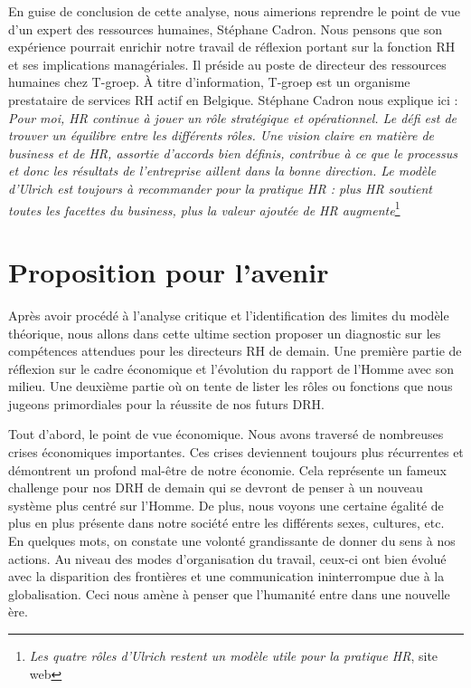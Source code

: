 \documentclass[a4paper, 12pt]{article}
\begin{document}
En guise de conclusion de cette analyse, nous aimerions reprendre le point de vue d'un expert des ressources humaines, Stéphane Cadron. Nous pensons que son expérience pourrait enrichir notre travail de réflexion portant sur la fonction RH et ses implications managériales. Il préside au poste de directeur des ressources humaines chez T-groep. À titre d'information, T-groep est un organisme prestataire de services RH actif en Belgique. Stéphane Cadron nous explique ici :
\textit{Pour moi, HR continue à jouer un rôle stratégique et opérationnel. Le défi est de trouver un équilibre entre les différents rôles. Une vision claire en matière de business et de HR, assortie d'accords bien définis, contribue à ce que le processus et donc les résultats de l'entreprise aillent dans la bonne direction. Le modèle d'Ulrich est toujours à recommander pour la pratique HR : plus HR soutient toutes les facettes du business, plus la valeur ajoutée de HR augmente}\footnote{\textit{Les quatre rôles d'Ulrich restent un modèle utile pour la pratique HR}, site web}

\section{Proposition pour l'avenir}

Après avoir procédé à l'analyse critique et l'identification des limites du modèle théorique, nous allons dans cette ultime section proposer un diagnostic sur les compétences attendues pour les directeurs RH de demain. Une première partie de réflexion sur le cadre économique et l'évolution du rapport de l'Homme avec son milieu. Une deuxième partie où on tente de lister les rôles ou fonctions que nous jugeons primordiales pour la réussite de nos futurs DRH.

Tout d'abord, le point de vue économique. Nous avons traversé de nombreuses crises économiques importantes. Ces crises deviennent toujours plus récurrentes et démontrent un profond mal-être de notre économie. Cela représente un fameux challenge pour nos DRH de demain qui se devront de penser à un nouveau système plus centré sur l'Homme. De plus, nous voyons une certaine égalité de plus en plus présente dans notre société entre les différents sexes, cultures, etc. En quelques mots, on constate une volonté grandissante de donner du sens à nos actions. Au niveau des modes d'organisation du travail, ceux-ci ont bien évolué avec la disparition des frontières et une communication ininterrompue due à la globalisation. Ceci nous amène à penser que l'humanité entre dans une nouvelle ère.
\end{document}
